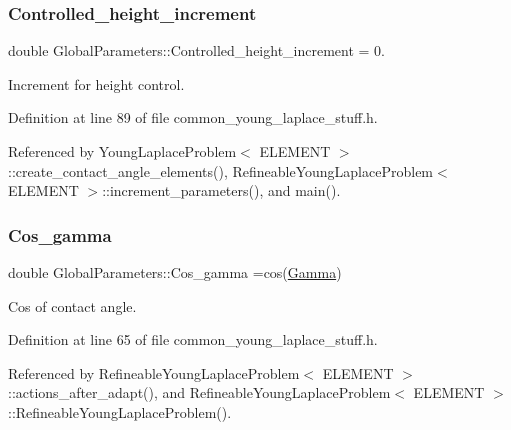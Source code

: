 \mbox{\label{namespaceGlobalParameters_a65fe7fd6c6c54d7ba89fab47cd4a9141}} 
\subsubsection{\texorpdfstring{Controlled\+\_\+height\+\_\+increment}{Controlled\_height\_increment}}
{\footnotesize\ttfamily double Global\+Parameters\+::\+Controlled\+\_\+height\+\_\+increment = 0.}



Increment for height control. 



Definition at line 89 of file common\+\_\+young\+\_\+laplace\+\_\+stuff.\+h.



Referenced by Young\+Laplace\+Problem$<$ E\+L\+E\+M\+E\+N\+T $>$\+::create\+\_\+contact\+\_\+angle\+\_\+elements(), Refineable\+Young\+Laplace\+Problem$<$ E\+L\+E\+M\+E\+N\+T $>$\+::increment\+\_\+parameters(), and main().

\mbox{\label{namespaceGlobalParameters_ae982fcb894e82c683d07d3c2fbbead3d}} 
\subsubsection{\texorpdfstring{Cos\+\_\+gamma}{Cos\_gamma}}
{\footnotesize\ttfamily double Global\+Parameters\+::\+Cos\+\_\+gamma =cos(\hyperlink{namespaceGlobalParameters_adb0a994119055242fcc762cac5edc317}{Gamma})}



Cos of contact angle. 



Definition at line 65 of file common\+\_\+young\+\_\+laplace\+\_\+stuff.\+h.



Referenced by Refineable\+Young\+Laplace\+Problem$<$ E\+L\+E\+M\+E\+N\+T $>$\+::actions\+\_\+after\+\_\+adapt(), and Refineable\+Young\+Laplace\+Problem$<$ E\+L\+E\+M\+E\+N\+T $>$\+::\+Refineable\+Young\+Laplace\+Problem().

